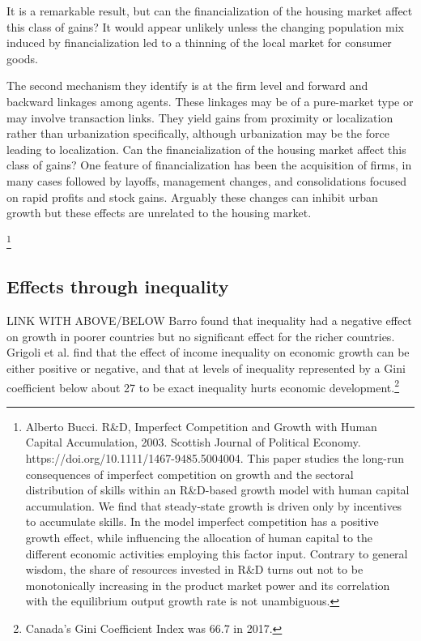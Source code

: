 It is a remarkable result, but can the financialization of the housing market affect this class of  gains? It would appear unlikely unless the changing population mix induced by financialization led to a thinning of the local market for consumer goods. 

 The second mechanism they identify is at the firm level and forward and backward linkages among agents. These linkages may be of a pure-market type or may involve transaction links. They yield gains from proximity or localization rather than urbanization specifically, although urbanization may be the force leading to localization. Can the financialization of the housing market affect this class of gains? One feature of financialization has been the acquisition of firms, in many cases followed by layoffs, management changes, and consolidations focused on rapid profits and stock gains. Arguably these changes can inhibit urban growth but these effects are unrelated to the housing market.

 \footnote{Alberto Bucci.  R\&D, Imperfect Competition and Growth with Human Capital Accumulation, 2003. Scottish Journal of Political Economy. https://doi.org/10.1111/1467-9485.5004004. This paper studies the long-run consequences of imperfect competition on growth and the sectoral distribution of skills within an R\&D-based growth model with human capital accumulation. We find that steady-state growth is driven only by incentives to accumulate skills. In the model imperfect competition has a positive growth effect, while influencing the allocation of human capital to the different economic activities employing this factor input. Contrary to general wisdom, the share of resources invested in R\&D turns out not to be monotonically increasing in the product market power and its correlation with the equilibrium output growth rate is not unambiguous.}

\subsection{Effects through inequality}
LINK WITH ABOVE/BELOW
Barro \cite{barroInequalityGrowthInvestment1999} found that inequality had a negative effect on growth in poorer countries but no significant effect for the richer countries. Grigoli et al. \cite{grigoliInequalityGrowthHeterogeneous2016} find  that the effect of income inequality on economic growth can be either positive or negative, and that at levels  of inequality  represented by a Gini coefficient below about 27  to be exact inequality hurts economic development.\footnote{Canada's Gini Coefficient Index was 66.7 in 2017. } %

